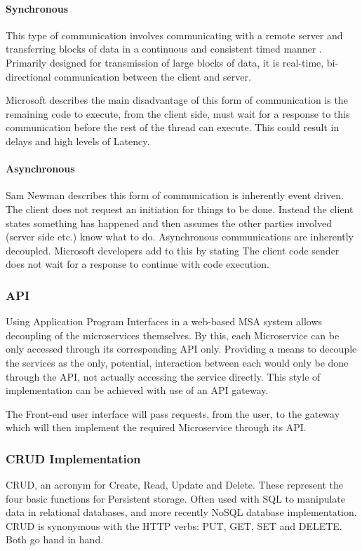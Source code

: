 	\paragraph{Synchronous}
	This type of communication involves communicating with a remote server and transferring blocks of data in a continuous and consistent timed manner \cite{SynchAsynch}. Primarily designed for transmission of large blocks of data, it is real-time, bi-directional communication between the client and server. 
	
	Microsoft \cite{.NetMSA} describes the main disadvantage of this form of communication is the remaining code to execute, from the client side, must wait for a response to this communication before the rest of the thread can execute. This could result in delays and high levels of Latency.
	\paragraph{Asynchronous}
	Sam Newman \cite{NewmanMSA} describes this form of communication is inherently event driven. The client does not request an initiation for things to be done. Instead the client states something has happened and then assumes the other parties involved (server side etc.) know what to do. Asynchronous communications are inherently decoupled. 
	Microsoft developers \cite{.NetMSA} add to this by stating The client code sender does not wait for a response to continue with code execution.
\subsubsection{API}
Using Application Program Interfaces in a web-based MSA system allows decoupling of the microservices themselves. By this, each Microservice can be only accessed through its corresponding API only. Providing a means to decouple the services as the only, potential, interaction between each would only be done through the API, not actually accessing the service directly. This style of implementation can be achieved with use of an API gateway.

The Front-end user interface will pass requests, from the user, to the gateway which will then implement the required Microservice through its API.
\subsubsection{CRUD Implementation}
CRUD, an acronym for Create, Read, Update and Delete. These represent the four basic functions for Persistent storage. Often used with SQL to manipulate data in relational databases, and more recently NoSQL database implementation. CRUD is synonymous with the HTTP verbs: PUT, GET, SET and DELETE. Both go hand in hand.  